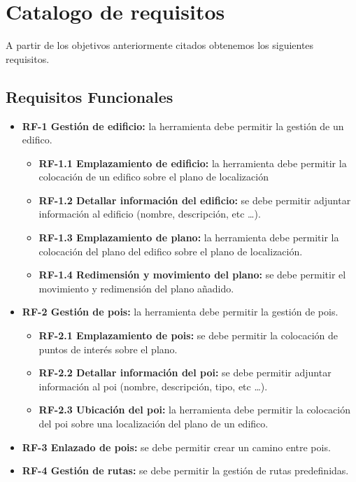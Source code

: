 \section{Catalogo de requisitos}
A partir de los objetivos anteriormente citados obtenemos los siguientes requisitos.

\subsection{Requisitos Funcionales}

\begin{itemize}
\item
\textbf{RF-1 Gestión de edificio:} la herramienta debe permitir la gestión de un edifico.
\begin{itemize}
	\item
	\textbf{RF-1.1 Emplazamiento de edificio:} la herramienta debe permitir la colocación de un edifico sobre el plano de localización
	\item
	\textbf{RF-1.2 Detallar información del edificio:} se debe permitir adjuntar información al edificio (nombre, descripción, etc			\ldots).
	\item
	\textbf{RF-1.3 Emplazamiento de plano:} la herramienta debe permitir la colocación del plano del edifico sobre el plano de 			localización.
	\item
	\textbf{RF-1.4 Redimensión y movimiento del plano:} se debe permitir el movimiento y redimensión del plano añadido.
\end{itemize}
\item
\textbf{RF-2 Gestión de pois:} la herramienta debe permitir la gestión de pois.
\begin{itemize}
	\item
	\textbf{RF-2.1 Emplazamiento de pois:} se debe permitir la colocación de puntos de interés sobre el plano.
	\item
	\textbf{RF-2.2 Detallar información del poi:} se debe permitir adjuntar información al poi (nombre, descripción, tipo, etc			\ldots).
	\item
	\textbf{RF-2.3 Ubicación del poi:} la herramienta debe permitir la colocación del poi sobre una localización del plano de un edifico.
\end{itemize}
\item
\textbf{RF-3 Enlazado de pois:} se debe permitir crear un camino entre pois.
\item
\textbf{RF-4 Gestión de rutas:} se debe permitir la gestión de rutas predefinidas.
\begin{itemize}

\end{itemize}
\end{itemize}
